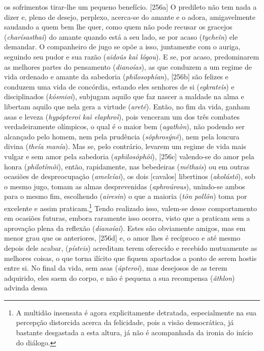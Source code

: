 os sofrimentos tirar-lhe um pequeno benefício. {[}256a{]} O predileto
não tem nada a dizer e, pleno de desejo, perplexo, acerca-se do amante e
o adora, amigavelmente saudando a quem bem lhe quer, como quem não pode
recusar os gracejos (\emph{charísasthai}) do amante quando está a seu
lado, se por acaso (\emph{tycheîn}) ele demandar. O companheiro de jugo
se opõe a isso, juntamente com o auriga, seguindo seu pudor e sua razão
(\emph{aidoûs kaì lógou}). E se, por acaso, predominarem as melhores
partes do pensamento (\emph{dianoías}), as que conduzem a um regime de
vida ordenado e amante da sabedoria (\emph{philosophían}), {[}256b{]}
são felizes e conduzem uma vida de concórdia, estando eles senhores de
si (\emph{egkrateîs}) e disciplinados (\emph{kósmioi}), subjugam aquilo
que faz nascer a maldade na alma e libertam aquilo que nela gera a
virtude (\emph{areté}). Então, no fim da vida, ganham asas e leveza
(\emph{hypópteroi kaì elaphroì}), pois venceram um dos três combates
verdadeiramente olímpicos, o qual é o maior bem (\emph{agathòn}), não
podendo ser alcançado pelo homem, nem pela prudência
(\emph{sôphrosýnê}), nem pela loucura divina (\emph{theía manía}). Mas
se, pelo contrário, levarem um regime de vida mais vulgar e sem amor
pela sabedoria (\emph{aphilosóphôi}), {[}256c{]} valendo-se do amor pela
honra (\emph{philotímôi}), então, rapidamente, nas bebedeiras
(\emph{méthais}) ou em outras ocasiões de despreocupação
(\emph{ameleíai}), os dois {[}cavalos{]} libertinos (\emph{akolástô}),
sob o mesmo jugo, tomam as almas desprevenidas (\emph{aphroúrous}),
unindo-se ambos para o mesmo fim, escolhendo (\emph{airesin}) o que a
maioria (\emph{tôn pollôn}) toma por excelente e assim
praticam.\footnote{A multidão insensata é agora explicitamente
  detratada, especialmente na sua percepção distorcida acerca da
  felicidade, pois a visão democrática, já bastante desgastada a esta
  altura, já não é acompanhada da ironia do início do diálogo.} Tendo
realizado isso, valem-se desse comportamento em ocasiões futuras, embora
raramente isso ocorra, visto que a praticam sem a aprovação plena da
reflexão (\emph{dianoíai}). Estes são obviamente amigos, mas em menor
grau que os anteriores, {[}256d{]} e, o amor lhes é recíproco e até
mesmo depois dele acabar, (\emph{písteis}) acreditam terem oferecido e
recebido mutuamente as melhores coisas, o que torna ilícito que fiquem
apartados a ponto de serem hostis entre si. No final da vida, sem asas
(\emph{ápteroi}), mas desejosos de as terem adquirido, eles saem do
corpo, e não é pequena a sua recompensa (\emph{âthlon}) advinda dessa
